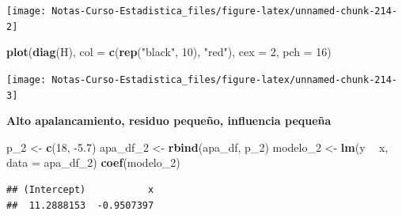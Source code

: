 \documentclass[
  12pt,
]{book}
\newenvironment{Shaded}{\begin{snugshade}}{\end{snugshade}}
\newcommand{\DataTypeTok}[1]{\textcolor[rgb]{0.13,0.29,0.53}{#1}}
\newcommand{\DecValTok}[1]{\textcolor[rgb]{0.00,0.00,0.81}{#1}}
\newcommand{\FloatTok}[1]{\textcolor[rgb]{0.00,0.00,0.81}{#1}}
\newcommand{\KeywordTok}[1]{\textcolor[rgb]{0.13,0.29,0.53}{\textbf{#1}}}
\newcommand{\NormalTok}[1]{#1}
\newcommand{\OperatorTok}[1]{\textcolor[rgb]{0.81,0.36,0.00}{\textbf{#1}}}
\newcommand{\StringTok}[1]{\textcolor[rgb]{0.31,0.60,0.02}{#1}}
\theoremstyle{definition}
\theoremstyle{definition}
\theoremstyle{definition}
\theoremstyle{remark}
\begin{document}
\begin{center}\texttt{[image: Notas-Curso-Estadistica\_files/figure-latex/unnamed-chunk-214-2]} \end{center}

\begin{Shaded}
\begin{Highlighting}[]
\KeywordTok{plot}\NormalTok{(}\KeywordTok{diag}\NormalTok{(H), }\DataTypeTok{col =} \KeywordTok{c}\NormalTok{(}\KeywordTok{rep}\NormalTok{(}\StringTok{"black"}\NormalTok{, }\DecValTok{10}\NormalTok{), }\StringTok{"red"}\NormalTok{), }\DataTypeTok{cex =} \DecValTok{2}\NormalTok{, }
    \DataTypeTok{pch =} \DecValTok{16}\NormalTok{)}
\end{Highlighting}
\end{Shaded}

\begin{center}\texttt{[image: Notas-Curso-Estadistica\_files/figure-latex/unnamed-chunk-214-3]} \end{center}

\textbf{Alto apalancamiento, residuo pequeño, influencia pequeña}

\begin{Shaded}
\begin{Highlighting}[]
\NormalTok{p_}\DecValTok{2}\NormalTok{ <-}\StringTok{ }\KeywordTok{c}\NormalTok{(}\DecValTok{18}\NormalTok{, }\FloatTok{-5.7}\NormalTok{)}
\NormalTok{apa_df_}\DecValTok{2}\NormalTok{ <-}\StringTok{ }\KeywordTok{rbind}\NormalTok{(apa_df, p_}\DecValTok{2}\NormalTok{)}
\NormalTok{modelo_}\DecValTok{2}\NormalTok{ <-}\StringTok{ }\KeywordTok{lm}\NormalTok{(y }\OperatorTok{~}\StringTok{ }\NormalTok{x, }\DataTypeTok{data =}\NormalTok{ apa_df_}\DecValTok{2}\NormalTok{)}
\KeywordTok{coef}\NormalTok{(modelo_}\DecValTok{2}\NormalTok{)}
\end{Highlighting}
\end{Shaded}

\begin{verbatim}
## (Intercept)           x 
##  11.2888153  -0.9507397
\end{verbatim}

\begin{Shaded}
\end{Shaded}
\end{document}
